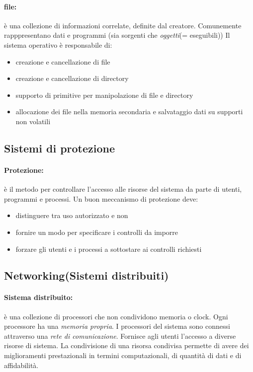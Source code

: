 \documentclass{article}
\begin{document}
\paragraph{file:} è una collezione di informazioni correlate, definite dal creatore. Comunemente rapppresentano dati e programmi (sia sorgenti che \textit{oggetti}(= eseguibili))
Il sistema operativo è responsabile di:
\begin{itemize}
    \item creazione e cancellazione di file
    \item creazione e cancellazione di directory
    \item supporto di primitive per manipolazione di file e directory
    \item allocazione dei file nella memoria secondaria e salvataggio dati su supporti non volatili
\end{itemize}

\subsection{Sistemi di protezione}

\paragraph{Protezione:} è il metodo per controllare l'accesso alle risorse del sistema da parte di utenti, programmi e processi.
Un buon meccanismo di protezione deve:
\begin{itemize}
    \item distinguere tra uso autorizzato e non
    \item fornire un modo per specificare i controlli da imporre
    \item forzare gli utenti e i processi a sottostare ai controlli richiesti
\end{itemize}

\subsection{Networking(Sistemi distribuiti)}
\paragraph{Sistema distribuito:} è una collezione di processori che non condividono memoria o clock. Ogni processore ha una \textit{memoria propria}.
I processori del sistema sono connessi attraverso una \textit{rete di comunicazione}. Fornisce agli utenti l'accesso a diverse risorse di sistema. La condivisione 
di una risorsa condivisa permette di avere dei miglioramenti prestazionali in termini computazionali, di quantità di dati e di affidabilità.
\end{document}
